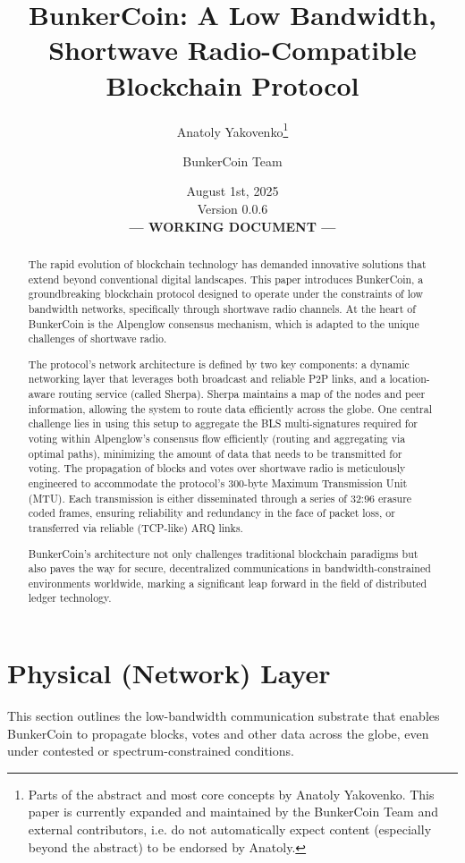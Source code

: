 \documentclass{article}
\title{BunkerCoin: A Low Bandwidth, Shortwave Radio-Compatible Blockchain Protocol}
\author{Anatoly Yakovenko\thanks{Parts of the abstract and most core concepts by Anatoly Yakovenko. This paper is currently expanded and maintained by the BunkerCoin Team and external contributors, i.e. do not automatically expect content (especially beyond the abstract) to be endorsed by Anatoly.} \and BunkerCoin Team}
\date{August 1st, 2025\\Version 0.0.6 \\[1em] \textbf{--- WORKING DOCUMENT ---}}
\begin{document}
\maketitle

\begin{abstract}
The rapid evolution of blockchain technology has demanded innovative solutions that extend beyond conventional digital landscapes. This paper introduces BunkerCoin, a groundbreaking blockchain protocol designed to operate under the constraints of low bandwidth networks, specifically through shortwave radio channels. At the heart of BunkerCoin is the Alpenglow consensus mechanism, which is adapted to the unique challenges of shortwave radio.

The protocol's network architecture is defined by two key components: a dynamic networking layer that leverages both broadcast and reliable P2P links, and a location-aware routing service (called Sherpa). Sherpa maintains a map of the nodes and peer information, allowing the system to route data efficiently across the globe. One central challenge lies in using this setup to aggregate the BLS multi-signatures required for voting within Alpenglow's consensus flow efficiently (routing and aggregating via optimal paths), minimizing the amount of data that needs to be transmitted for voting. The propagation of blocks and votes over shortwave radio is meticulously engineered to accommodate the protocol's 300-byte Maximum Transmission Unit (MTU). Each transmission is either disseminated through a series of 32:96 erasure coded frames, ensuring reliability and redundancy in the face of packet loss, or transferred via reliable  (TCP-like) ARQ links.

BunkerCoin's architecture not only challenges traditional blockchain paradigms but also paves the way for secure, decentralized communications in bandwidth-constrained environments worldwide, marking a significant leap forward in the field of distributed ledger technology.
\end{abstract}

\section{Physical (Network) Layer}
\label{sec:physical}

This section outlines the low-bandwidth communication substrate that enables BunkerCoin to propagate blocks, votes and other data across the globe, even under contested or spectrum-constrained conditions.
\end{document}
